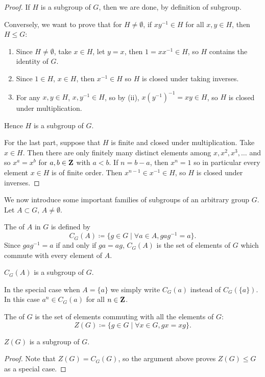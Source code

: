 \begin{proof}
If $H$ is a subgroup of $G$, then we are done, by definition of subgroup.

Conversely, we want to prove that for $H\neq\emptyset$, if $xy^{-1}\in H$ for all $x,y\in H$, then $H\le G$:
\begin{enumerate}[label=(\roman*)]
\item Since $H\neq\emptyset$, take $x\in H$, let $y=x$, then $1=xx^{-1}\in H$, so $H$ contains the identity of $G$.
\item Since $1\in H$, $x\in H$, then $x^{-1}\in H$ so $H$ is closed under taking inverses.
\item For any $x,y\in H$, $x,y^{-1}\in H$, so by (ii), $x(y^{-1})^{-1}=xy\in H$, so $H$ is closed under multiplication.
\end{enumerate}
Hence $H$ is a subgroup of $G$.

For the last part, suppose that $H$ is finite and closed under multiplication. Take $x\in H$. Then there are only finitely many distinct elements among $x,x^2,x^3,\dots$ and so $x^a=x^b$ for $a,b\in\mathbf Z$ with $a<b$. If $n=b-a$, then $x^n=1$ so in particular every element $x\in H$ is of finite order. Then $x^{n-1}\in x^{-1}\in H$, so $H$ is closed under inverses.
\end{proof}

We now introduce some important families of subgroups of an arbitrary group $G$. Let $A\subset G$, $A\neq\emptyset$.

\begin{example}[Centraliser]
The  of $A$ in $G$ is defined by
\[C_G(A)\coloneqq\{g\in G\mid\forall a\in A,gag^{-1}=a\}.\]
Since $gag^{-1}=a$ if and only if $ga=ag$, $C_G(A)$ is the set of elements of $G$ which commute with every element of $A$.

\begin{proposition}
$C_G(A)$ is a subgroup of $G$.
\end{proposition}

\begin{notation}
In the special case when $A=\{a\}$ we simply write $C_G(a)$ instead of $C_G(\{a\})$. In this case $a^n\in C_G(a)$ for all $n\in\mathbf Z$.
\end{notation}
\end{example}

\begin{example}[Center]
The  of $G$ is the set of elements commuting with all the elements of $G$:
\[Z(G)\coloneqq\{g\in G\mid\forall x\in G,gx=xg\}.\]

\begin{proposition}
$Z(G)$ is a subgroup of $G$.
\end{proposition}

\begin{proof}
Note that $Z(G)=C_G(G)$, so the argument above proves $Z(G)\le G$ as a special case.
\end{proof}
\end{example}

